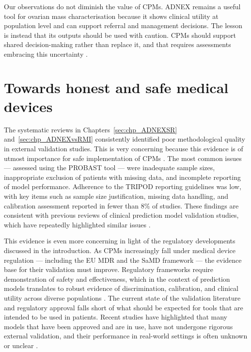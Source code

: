 Our observations do not diminish the value of \glspl{CPM}. \gls{ADNEX} remains a useful tool for ovarian mass characterisation because it shows clinical utility at population level and can support referral and management decisions. The lesson is instead that its outputs should be used with caution. \glspl{CPM} should support shared decision-making rather than replace it, and that requires assessments embracing this uncertainty \cite{moonsCriticalAppraisalData2014, steyerbergClinicalPredictionModels2009}.

\section{Towards honest and safe medical devices}

The systematic reviews in Chapters~\ref{sec:chp_ADNEXSR} and~\ref{sec:chp_ADNEXvsRMI} consistently identified poor methodological quality in external validation studies. This is very concerning because this evidence is of utmost importance for safe implementation of \glspl{CPM} \cite{steyerbergPredictionModelsNeed2016}.  The most common issues --- assessed using the \gls{PROBAST} tool \cite{wolffPROBASTToolAssess2019} --- were inadequate sample sizes, inappropriate exclusion of patients with missing data, and incomplete reporting of model performance. Adherence to the \gls{TRIPOD} reporting guidelines \cite{collinsTRIPODAIStatementUpdated2024} was low, with key items such as sample size justification, missing data handling, and calibration assessment reported in fewer than 8\% of studies. These findings are consistent with previous reviews of clinical prediction model validation studies, which have repeatedly highlighted similar issues \cite{collinsExternalValidationMultivariable2014, bouwmeesterReportingMethodsClinical2012, andaurnavarroCompletenessReportingClinical2022,andaurnavarroSystematicReviewFinds2023, andaurnavarroSystematicReviewIdentifies2023, dhimanMethodologicalConductPrognostic2022, dhimanOverinterpretationFindingsMachine2023}.

This evidence is even more concerning in light of the regulatory developments discussed in the introduction. As \glspl{CPM} increasingly fall under medical device regulation --- including the EU \gls{MDR} and the \gls{SaMD} framework --- the evidence base for their validation must improve. Regulatory frameworks require demonstration of safety and effectiveness, which in the context of prediction models translates to robust evidence of discrimination, calibration, and clinical utility across diverse populations \cite{vancalsterPerformanceEvaluationPredictive2024, collinsTRIPODAIStatementUpdated2024}. The current state of the validation literature and regulatory approval falls short of what should be expected for tools that are intended to be used in patients. Recent studies have highlighted that many models that have been approved and are in use, have not undergone rigorous external validation, and their performance in real-world settings is often unknown or unclear \cite{mehtaEvaluatingTransparencyAI2025,vanleeuwenArtificialIntelligenceRadiology2021}.

